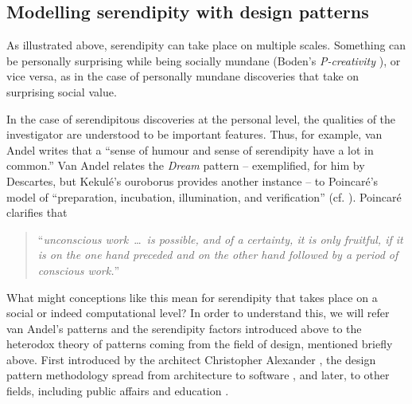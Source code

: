 \subsection{Modelling serendipity with design patterns} \label{sec:unified-approach}

As illustrated above, serendipity can take place on multiple scales.
Something can be personally surprising while being socially mundane
(Boden's \emph{P-creativity} \cite{boden}), or vice versa, as in
the case of personally mundane discoveries that take on surprising
social value.

In the case of serendipitous discoveries at the personal level, the
qualities of the investigator are understood to be important features.
Thus, for example, van Andel writes that a ``sense of humour and
  sense of serendipity have a lot in common.'' 
% 
Van Andel relates the \emph{Dream} pattern -- exemplified, for him by
Descartes, but Kekul\'e's ouroborus provides another instance -- to
Poincar\'e's \cite{poincare1910creation,poincare2013science} model of
``preparation, incubation, illumination, and verification''
(cf. \cite{wallas1926art}).  Poincar\'e \cite{poincare1910creation}
clarifies that
\begin{quote}
``\emph{unconscious work}~\ldots~\emph{is possible, and of a
    certainty, it is only fruitful, if it is on the one hand preceded
    and on the other hand followed by a period of conscious work.}''
\end{quote}

What might conceptions like this mean for serendipity that takes place
on a social or indeed computational level?  In order to understand
this, we will refer van Andel's patterns and the serendipity factors
introduced above to the heterodox theory of patterns coming from the
field of design, mentioned briefly above.  First introduced by the
architect Christopher Alexander
\cite{alexander1979timeless,alexander1977pattern}, the design pattern
methodology spread from architecture to software
\cite{gabriel1996patterns}, and later, to other fields, including
public affairs \cite{schuler2008liberating} and education
\cite{bergin2012pedagogical}.

